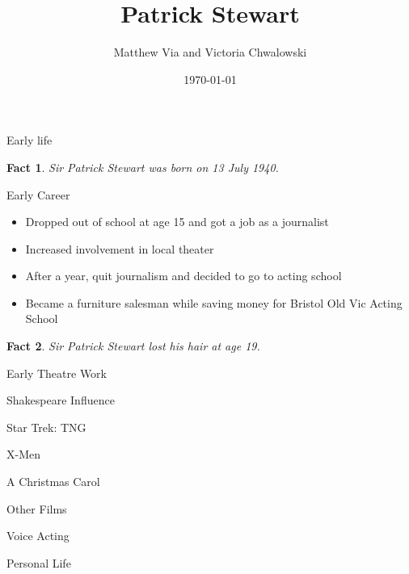 \documentclass[xcolor=dvipsnames]{beamer}
\begin{document}
\author{Matthew Via and Victoria Chwalowski}
\title{Patrick Stewart}
\date{\today}
\begin{frame}{}
\titlepage
\newtheorem{fct}{Fact}

\end{frame}
\begin{frame}{Early life}
  \begin{fct}
    Sir Patrick Stewart was born on 13 July 1940.
  \end{fct}
\end{frame}
\begin{frame}{Early Career}
  \begin{itemize}
    \item Dropped out of school at age 15 and got a job as a journalist
    \item Increased involvement in local theater
    \item After a year, quit journalism and decided to go to acting school
    \item Became a furniture salesman while saving money for Bristol Old Vic
    Acting School
  \end{itemize}
  \begin{fct}
    Sir Patrick Stewart lost his hair at age 19.
  \end{fct}
\end{frame}
\begin{frame}{Early Theatre Work}

\end{frame}
\begin{frame}{Shakespeare Influence}

\end{frame}
\begin{frame}{Star Trek: TNG}

\end{frame}
\begin{frame}{X-Men}

\end{frame}
\begin{frame}{A Christmas Carol}

\end{frame}
\begin{frame}{Other Films}

\end{frame}
\begin{frame}{Voice Acting}

\end{frame}
\begin{frame}{Personal Life}

\end{frame}
\end{document}
